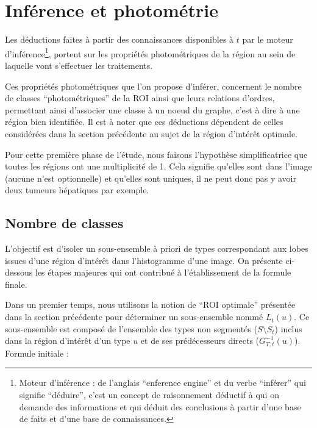     \section{Inférence et photométrie}
    \label{sec:inf_and_photo}
	Les déductions faites à partir des connaissances disponibles à $t$ par le moteur d'inférence\footnote{Moteur d'inférence : de l'anglais ``enference engine'' et du verbe ``inférer'' qui signifie ``déduire'', c'est un concept de raisonnement déductif à qui on demande des informations et qui déduit des conclusions à partir d'une base de faits et d'une base de connaissances.}, portent sur les propriétés photométriques de la région au sein de laquelle vont s'effectuer les traitements. 

Ces propriétés photométriques que l'on propose d'inférer, concernent le nombre de classes ``photométriques'' de la ROI ainsi que leurs relations d'ordres, permettant ainsi d'associer une classe à un noeud du graphe, c'est à dire à une région bien identifiée. Il est à noter que ces déductions dépendent de celles considérées dans la section précédente au sujet de la région d'intérêt optimale.

Pour cette première phase de l'étude, nous faisons l'hypothèse simplificatrice que toutes les régions ont une multiplicité de 1. Cela signifie qu'elles sont dans l'image (aucune n'est optionnelle) et qu'elles sont uniques, il ne peut donc pas y avoir deux tumeurs hépatiques par exemple.

      \subsection{Nombre de classes}
	L'objectif est d'isoler un sous-ensemble à priori de types correspondant aux lobes issues d'une région d'intérêt dans l'histogramme d'une image. On présente ci-dessous les étapes majeures qui ont contribué à l'établissement de la formule finale.

	Dans un premier temps, nous utilisons la notion de ``ROI optimale'' présentée dans la section précédente pour déterminer un sous-ensemble nommé $L_t(u)$. Ce sous-ensemble est composé de l'ensemble des types non segmentés ($S \setminus S_t$) inclus dans la région d'intérêt d'un type $u$ et de ses prédécesseurs directs ($G_{T,t}^{-1}(u)$). Formule initiale :


